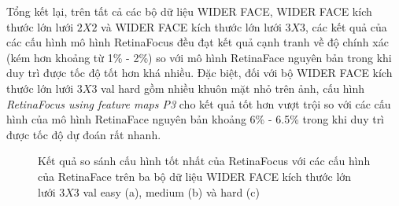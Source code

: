 {    \noindent
    Tổng kết lại, trên tất cả các bộ dữ liệu WIDER FACE, WIDER FACE kích thước lớn lưới $2 X 2$ và WIDER FACE kích thước lớn lưới $3 X 3$, các kết quả của các cấu hình mô hình RetinaFocus đều đạt kết quả cạnh tranh về độ chính xác (kém hơn khoảng từ 1\% - 2\%) so với mô hình RetinaFace nguyên bản trong khi duy trì được tốc độ tốt hơn khá nhiều.
    Đặc biệt, đối với bộ WIDER FACE kích thước lớn lưới $3 X 3$ val hard gồm nhiều khuôn mặt nhỏ trên ảnh, cấu hình \textit{RetinaFocus using feature maps P3} cho kết quả tốt hơn vượt trội so với các cấu hình của mô hình RetinaFace nguyên bản khoảng 6\% - 6.5\% trong khi duy trì được tốc độ dự đoán rất nhanh.

    \begin{figure}[H]
        \centering
        \caption{Kết quả so sánh cấu hình tốt nhất của RetinaFocus với các cấu hình của RetinaFace trên ba bộ dữ liệu WIDER FACE kích thước lớn lưới $3 X 3$ val easy (a), medium (b) và hard (c)}
        \label{fig:retinafocus_widerface_3k_val_rtnf}
    \end{figure}
}